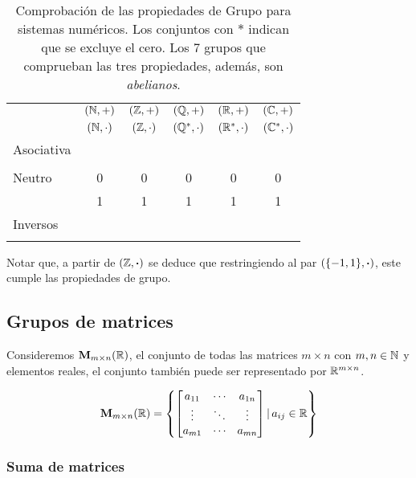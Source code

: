 \begin{table}[h]
	\centering
	\begin{tabular}{|l|c|c|c|c|c|}
		\hline
		& $(\mathbb{N}, +)$ & $(\mathbb{Z}, +)$ & $(\mathbb{Q}, +)$ & $(\mathbb{R}, +)$ & $(\mathbb{C}, +)$ \\
		& $(\mathbb{N}, \cdot)$ & $(\mathbb{Z}, \cdot)$ & $(\mathbb{Q}^{*}, \cdot)$ & $(\mathbb{R}^{*}, \cdot)$ & $(\mathbb{C}^{*}, \cdot)$ \\ \hline
		Asociativa & \cmark & \cmark & \cmark  & \cmark &  \cmark \\
		& \cmark & \cmark & \cmark  & \cmark  &  \cmark \\ \hline
		Neutro & 0 & 0 & 0  & 0 & 0 \\
		& 1 & 1 & 1  & 1  &  1 \\ \hline
		Inversos & \xmark & \cmark & \cmark  & \cmark & \cmark \\
		& \xmark & \xmark & \cmark  & \cmark & \cmark \\ \hline
	\end{tabular}
	\caption{Comprobación de las propiedades de Grupo para sistemas numéricos. Los conjuntos con $*$ indican que se excluye el cero. Los 7 grupos que comprueban las tres propiedades, además, son \textit{abelianos}.}
\end{table}
Notar que, a partir de $(\mathbb{Z}, \boldsymbol{\cdot})$ se deduce que restringiendo al par $\left(\{ -1, 1 \}, \boldsymbol{\cdot} \right)$, este cumple las propiedades de grupo.


\subsection{Grupos de matrices} \label{sec:matrices}

Consideremos $\mathbf{M}_{m\times n}(\mathbb{R})$, el conjunto de todas las matrices $m \times n$ con $m, n \in \mathbb{N}$ y elementos reales, el conjunto también puede ser representado por $\mathbb{R}^{m \times n}$.

\begin{equation}
	\mathbf{M}_{m \times n}(\mathbb{R}) = \left\{ \begin{bmatrix}
		a_{11} & \cdots & a_{1n}\\
		\vdots & \ddots & \vdots\\
		a_{m1} & \cdots & a_{mn}
	\end{bmatrix} | \, a_{ij} \in \mathbb{R} \right\}
	\label{eq:matrices}
\end{equation}

\subsubsection{Suma de matrices}

